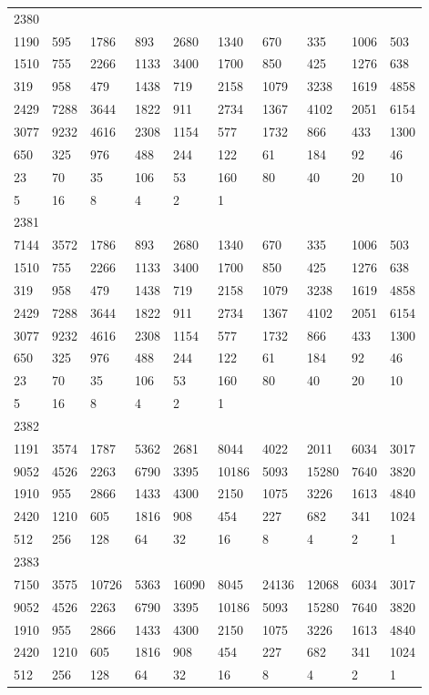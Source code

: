 \begin{longtable}{*{10}{l}}
2380&&&&&&&&&\\
1190& 595& 1786& 893& 2680& 1340& 670& 335& 1006& 503\\
1510& 755& 2266& 1133& 3400& 1700& 850& 425& 1276& 638\\
319& 958& 479& 1438& 719& 2158& 1079& 3238& 1619& 4858\\
2429& 7288& 3644& 1822& 911& 2734& 1367& 4102& 2051& 6154\\
3077& 9232& 4616& 2308& 1154& 577& 1732& 866& 433& 1300\\
650& 325& 976& 488& 244& 122& 61& 184& 92& 46\\
23& 70& 35& 106& 53& 160& 80& 40& 20& 10\\
5& 16& 8& 4& 2& 1& \\

2381&&&&&&&&&\\
7144& 3572& 1786& 893& 2680& 1340& 670& 335& 1006& 503\\
1510& 755& 2266& 1133& 3400& 1700& 850& 425& 1276& 638\\
319& 958& 479& 1438& 719& 2158& 1079& 3238& 1619& 4858\\
2429& 7288& 3644& 1822& 911& 2734& 1367& 4102& 2051& 6154\\
3077& 9232& 4616& 2308& 1154& 577& 1732& 866& 433& 1300\\
650& 325& 976& 488& 244& 122& 61& 184& 92& 46\\
23& 70& 35& 106& 53& 160& 80& 40& 20& 10\\
5& 16& 8& 4& 2& 1& \\

2382&&&&&&&&&\\
1191& 3574& 1787& 5362& 2681& 8044& 4022& 2011& 6034& 3017\\
9052& 4526& 2263& 6790& 3395& 10186& 5093& 15280& 7640& 3820\\
1910& 955& 2866& 1433& 4300& 2150& 1075& 3226& 1613& 4840\\
2420& 1210& 605& 1816& 908& 454& 227& 682& 341& 1024\\
512& 256& 128& 64& 32& 16& 8& 4& 2& 1\\

2383&&&&&&&&&\\
7150& 3575& 10726& 5363& 16090& 8045& 24136& 12068& 6034& 3017\\
9052& 4526& 2263& 6790& 3395& 10186& 5093& 15280& 7640& 3820\\
1910& 955& 2866& 1433& 4300& 2150& 1075& 3226& 1613& 4840\\
2420& 1210& 605& 1816& 908& 454& 227& 682& 341& 1024\\
512& 256& 128& 64& 32& 16& 8& 4& 2& 1\\


\end{longtable}

